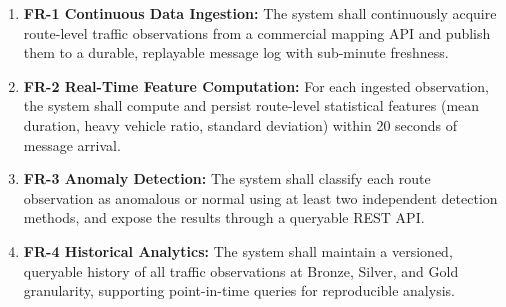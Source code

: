   \begin{enumerate}
      \item \textbf{FR-1 Continuous Data Ingestion:} The system shall
      continuously acquire route-level traffic observations from a commercial                                                                             
      mapping API and publish them to a durable, replayable message log with                                                                              
      sub-minute freshness.                                                                                                                               
                                                                                                                                                          
      \item \textbf{FR-2 Real-Time Feature Computation:} For each ingested                                                                                
      observation, the system shall compute and persist route-level statistical
      features (mean duration, heavy vehicle ratio, standard deviation) within                                                                            
      20 seconds of message arrival.                                                                                                                      
                                                                                                                                                          
      \item \textbf{FR-3 Anomaly Detection:} The system shall classify each                                                                               
      route observation as anomalous or normal using at least two independent                                                                             
      detection methods, and expose the results through a queryable REST API.                                                                             
                                                                                                                                                          
      \item \textbf{FR-4 Historical Analytics:} The system shall maintain a                                                                               
      versioned, queryable history of all traffic observations at Bronze,                                                                                 
      Silver, and Gold granularity, supporting point-in-time queries for                                                                                  
      reproducible analysis.
                                                                                                                                                          

\end{enumerate}
